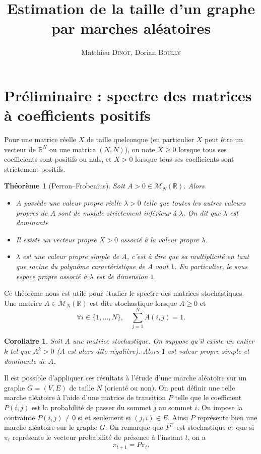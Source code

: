 \documentclass[11pt]{article}
\title{Estimation de la taille d'un graphe par marches aléatoires}
\author{Matthieu \textsc{Dinot}, Dorian \textsc{Boully}}
\date{}
\newcommand{\R}{\mathbb{R}}
\renewcommand{\geq}{\geqslant}
\theoremstyle{plain}
\newtheorem{thm}{Théorème}
\newtheorem{coro}{Corollaire}
\begin{document}
\maketitle
\section*{Préliminaire : spectre des matrices à coefficients positifs}
Pour une matrice réelle $X$ de taille quelconque (en particulier $X$ peut être un vecteur de $\R^{N}$ ou une matrice $(N,N)$), on note $X \geq 0$ lorsque tous ses coefficients sont positifs ou nuls, et $X > 0$ lorsque tous ses coefficients sont strictement positifs.
\begin{thm}[Perron--Frobenius]
    Soit $A > 0 \in \mathcal{M}_N (\R)$. Alors
    \begin{itemize}
        \item $A$ possède une valeur propre réelle $\lambda > 0$ telle que toutes les autres valeurs propres de $A$ sont de module strictement inférieur à $\lambda$. On dit que $\lambda$ est dominante
        \item Il existe un vecteur propre $X > 0$ associé à la valeur propre $\lambda$.
        \item $\lambda$ est une valeur propre simple de $A$, c'est à dire que sa multiplicité en tant que racine du polynôme caractéristique de $A$ vaut $1$. En particulier, le sous espace propre associé à $\lambda$ est de dimension $1$.
    \end{itemize}
\end{thm}
Ce théorème nous est utile pour étudier le spectre des matrices stochastiques. Une matrice $A \in \mathcal{M}_N (\R)$ est dite stochastique lorsque $A \geq 0$ et 
$$\forall i \in \{1, \ldots, N\}, \quad \sum_{j = 1}^{N} A(i,j) = 1.$$ 
\begin{coro}\label{coro}
    Soit $A$ une matrice stochastique. On suppose qu'il existe un entier $k$ tel que $A^{k} > 0$ ($A$ est alors dite régulière). Alors $1$ est valeur propre simple et dominante de $A$.
\end{coro}
Il est possible d'appliquer ces résultats à l'étude d'une marche aléatoire sur un graphe $G = (V, E)$ de taille $N$ (orienté ou non). On peut définir une telle marche aléatoire à l'aide d'une matrice de transition $P$ telle que le coefficient $P(i,j)$ est la probabilité de passer du sommet $j$ au sommet $i$. On impose la contrainte $P(i,j) \neq 0$ si et seulement si $(j,i) \in E$. Ainsi $P$ représente bien une marche aléatoire sur le graphe $G$. On remarque que $P^{\top}$ est stochastique et que si $\pi_t$ représente le vecteur probabilité de présence à l'instant $t$, on a
$$\pi_{t+1} = P \pi_t.$$
\end{document}
